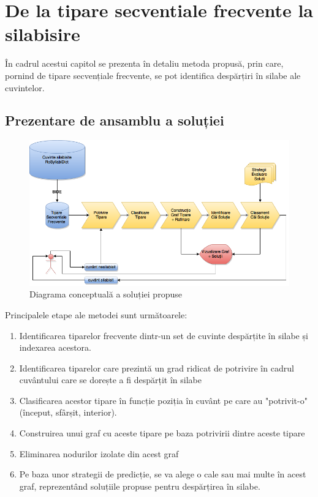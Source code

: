 \chapter{De la tipare secventiale frecvente la silabisire}
\label{cap:contributii}

În cadrul acestui capitol se prezenta în detaliu metoda propusă, prin care, pornind de tipare secvențiale frecvente, se pot identifica despărțiri în silabe ale cuvintelor.  

\section{Prezentare de ansamblu a soluției}

\begin{figure}[h]
    \centering
    \includegraphics[width=\textwidth]{figures/rosil-flow.png}
    \caption{Diagrama conceptuală a soluției propuse}
    \label{fig:rosil-flow}
\end{figure}

Principalele etape ale metodei sunt următoarele:
\begin{enumerate}
\item Identificarea tiparelor frecvente dintr-un set de cuvinte despărțite în silabe și indexarea acestora.
\item Identificarea tiparelor care prezintă un grad ridicat de potrivire în cadrul cuvântului care se dorește a fi despărțit în silabe
\item Clasificarea acestor tipare în funcție poziția în cuvânt pe care au "potrivit-o" (început, sfârșit, interior).
\item Construirea unui graf cu aceste tipare pe baza potrivirii dintre aceste tipare
\item Eliminarea nodurilor izolate din acest graf
\item Pe baza unor strategii de predicție, se va alege o cale sau mai multe în acest graf, reprezentând soluțiile propuse pentru despărțirea în silabe.
\end{enumerate}

